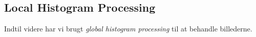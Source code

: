 \subsection{Local Histogram Processing}

Indtil videre har vi brugt \textit{global histogram processing} til at behandle billederne. 

